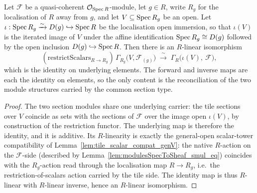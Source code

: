 \begin{lemma}
  \label{lem:tileReconcileEquiv}
  Let \(\mathcal{F}\) be a quasi-coherent \(\mathcal{O}_{\operatorname{Spec} R}\)-module, let \(g \in R\), write \(R_g\)
  for the localisation of \(R\) away from \(g\), and let \(V \subseteq \operatorname{Spec} R_g\) be an open. Let
  \(\iota : \operatorname{Spec} R_g \xrightarrow{\sim} D(g) \hookrightarrow \operatorname{Spec} R\) be the localisation open
  immersion, so that \(\iota(V)\) is the iterated image of \(V\) under the affine identification
  \(\operatorname{Spec} R_g \cong D(g)\) followed by the open inclusion \(D(g) \hookrightarrow \operatorname{Spec} R\). Then there is
  an \(R\)-linear isomorphism
  \[
    (\mathrm{restrictScalars}_{R \to R_g})\, \Gamma_{R_g}\bigl(V, \mathcal{F}_{(g)}\bigr)
      \;\xrightarrow{\ \sim\ }\;
      \Gamma_R\bigl(\iota(V),\ \mathcal{F}\bigr),
  \]
  which is the identity on underlying elements. The forward and inverse maps are each the identity on
  elements, so the only content is the reconciliation of the two module structures carried by the
  common section type.
\end{lemma}
\begin{proof}
  The two section modules share one underlying carrier: the tile sections over \(V\) coincide as
  sets with the sections of \(\mathcal{F}\) over the image open \(\iota(V)\), by construction of the
  restriction functor. The underlying map is therefore the identity, and it is additive. Its \(R\)-linearity is
  exactly the general-open scalar-tower compatibility of Lemma~\ref{lem:tile_scalar_compat_genV}: the
  native \(R\)-action on the \(\mathcal{F}\)-side (described by
  Lemma~\ref{lem:modulesSpecToSheaf_smul_eq}) coincides with the \(R_g\)-action read through the
  localisation map \(R \to R_g\), i.e.\ the restriction-of-scalars action carried by the tile side. The
  identity map is thus \(R\)-linear with \(R\)-linear inverse, hence an \(R\)-linear isomorphism.
\end{proof}

